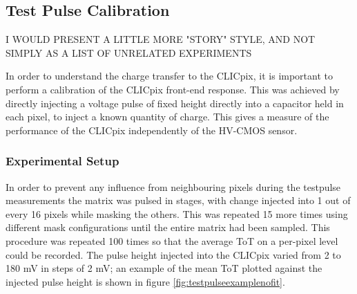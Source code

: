 \subsection{Test Pulse Calibration}

I WOULD PRESENT A LITTLE MORE "STORY" STYLE, AND NOT SIMPLY AS A LIST OF UNRELATED EXPERIMENTS

In order to understand the charge transfer to the CLICpix, it is important to perform a calibration of the CLICpix front-end response. This was achieved by directly injecting a voltage pulse of fixed height directly into a capacitor held in each pixel, to inject a known quantity of charge. This gives a measure of the performance of the CLICpix independently of the HV-CMOS sensor.  %


\subsubsection{Experimental Setup}

In order to prevent any influence from neighbouring pixels during the testpulse measurements the matrix was pulsed in stages, with change injected into 1 out of every 16 pixels while masking the others.  This was repeated 15 more times using different mask configurations until the entire matrix had been sampled. This procedure was repeated 100 times so that the average ToT on a per-pixel level could be recorded.  The pulse height injected into the CLICpix varied from 2 to 180 mV in steps of 2 mV;  an example of the mean ToT plotted against the injected pulse height is shown in figure \ref{fig:testpulseexamplenofit}.  

